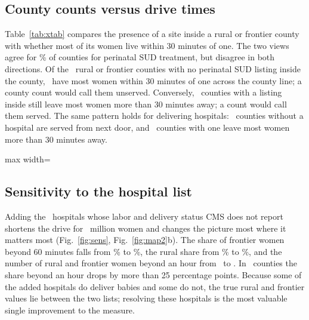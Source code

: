 \documentclass[10pt,twocolumn,letterpaper]{article}
\begin{document}
\subsection{County counts versus drive times}
Table~\ref{tab:xtab} compares the presence of a site inside a rural or frontier county with whether most of its women live within 30 minutes of one. The two views agree for \XPPWAgree\% of counties for perinatal SUD treatment, but disagree in both directions. Of the \XPPWNone\ rural or frontier counties with no perinatal SUD listing inside the county, \XPPWNoneReach\ have most women within 30 minutes of one across the county line; a county count would call them unserved. Conversely, \XPPWInFar\ counties with a listing inside still leave most women more than 30 minutes away; a count would call them served. The same pattern holds for delivering hospitals: \XOBNoneReach\ counties without a hospital are served from next door, and \XOBInFar\ counties with one leave most women more than 30 minutes away.

\begin{table}[tbp]
\centering\footnotesize
\caption{Rural and frontier counties by whether a site lies inside the county and whether most women live within 30 minutes of one.}\label{tab:xtab}
\begin{adjustbox}{max width=\columnwidth}\end{adjustbox}
\end{table}

\subsection{Sensitivity to the hospital list}
Adding the \SitesOBAdded\ hospitals whose labor and delivery status CMS does not report shortens the drive for \SensWomenChangeMillions\ million women and changes the picture most where it matters most (Fig.~\ref{fig:sens}, Fig.~\ref{fig:map2}b). The share of frontier women beyond 60 minutes falls from \OBFrontierSixty\% to \OBUFrontierSixty\%, the rural share from \OBRuralSixty\% to \OBURuralSixty\%, and the number of rural and frontier women beyond an hour from \RFWomenSixtyOB\ to \RFWomenSixtyOBU. In \SensCountiesChange\ counties the share beyond an hour drops by more than 25 percentage points. Because some of the added hospitals do deliver babies and some do not, the true rural and frontier values lie between the two lists; resolving these hospitals is the most valuable single improvement to the measure.
\end{document}
